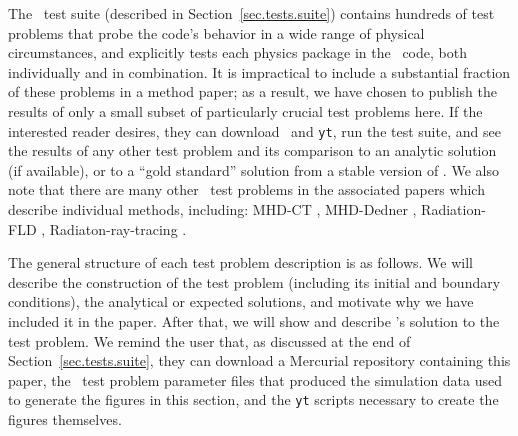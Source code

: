 The \enzo\ test suite (described in Section~\ref{sec.tests.suite})
contains hundreds of test problems that probe the code's behavior in a
wide range of physical circumstances, and explicitly tests each physics
package in the \enzo\ code, both individually and in combination.  It
is impractical to include a substantial fraction of these problems in
a method paper; as a result, we have chosen to publish the results of
only a small subset of particularly crucial test problems here.  If
the interested reader desires, they can download \enzo\ and
\texttt{yt}, run the test suite, and see the results of any other test
problem and its comparison to an analytic solution (if available), or
to a ``gold standard'' solution from a stable version of \enzo.
We also note that there are many other \enzo\ test problems in the
associated papers which describe individual methods, including:
MHD-CT \citep{Collins10}, MHD-Dedner \citep{WangAbelZhang08,
WangAbel09}, Radiation-FLD \citep{NBHBROW2007,
ReynoldsHayesPaschosNorman2009, NRS2009}, Radiaton-ray-tracing
\citep{Wise11_Moray}.

The general structure of each test problem description is as follows.
We will describe the construction of the test problem (including its
initial and boundary conditions), the analytical or expected
solutions, and motivate why we have included it in the paper.  After
that, we will show and describe \enzo's solution to the test problem.
We remind the user that, as discussed at the end of
Section~\ref{sec.tests.suite}, they can download a Mercurial
repository containing this paper, the \enzo\ test problem parameter
files that produced the simulation data used to generate the figures
in this section, and the \texttt{yt} scripts necessary to create the
figures themselves.


































